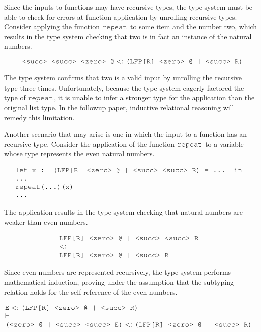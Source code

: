 \documentclass[acmsmall]{acmart}
\theoremstyle{definition}
\begin{document}
Since the inputs to functions may have recursive types, the type 
system must be able to check for errors at function application by unrolling
recursive types.
Consider applying the function $\J{repeat}$ to some item and the number two, 
which results in the type system checking that two is in fact an instance of the natural numbers.

\[
  \J{ <succ> <succ> <zero> @} \subtypes \J{(LFP[R] <zero> @ | <succ> R)}
\]

\noindent
The type system confirms that two is a valid input by unrolling the recursive type three times.
Unfortunately, because the type system eagerly factored the type of $\J{repeat}$, it
is unable to infer a stronger type for the application than the original list type. 
In the followup paper, inductive relational reasoning will remedy this limitation.


Another scenario that may arise is one in which the input to a function has an recursive type.
Consider the application of the function $\J{repeat}$ to a variable whose type represents the even natural numbers.

\[
  \begin{array}[t]{@{} l}
    \J{let x : (LFP[R] <zero> @ | <succ> <succ> R) = ... in}
    \\
    \J{...}
    \\
    \J{repeat(...)(x)} 
    \\
    \J{...}
  \end{array}
\]

\noindent
The application results in the type system checking that natural numbers are weaker than even numbers. 

\[
  \begin{array}[t]{@{} l}
    \J{LFP[R] <zero> @ | <succ> <succ> R}
    \\
    \subtypes
    \\
    \J{LFP[R] <zero> @ | <succ> R}
  \end{array}
\]

\noindent
Since even numbers are represented recursively, the type system performs mathematical induction,
proving under the assumption that the subtyping relation holds for the self reference of the even numbers. 

\[
  \begin{array}[t]{@{} l}
    \J{E} \subtypes \J{(LFP[R] <zero> @ | <succ> R)}
    \\
    \entails
    \\
    \J{(<zero> @ | <succ> <succ> E)} \subtypes \J{(LFP[R] <zero> @ | <succ> R)}
  \end{array}
\]
\end{document}
